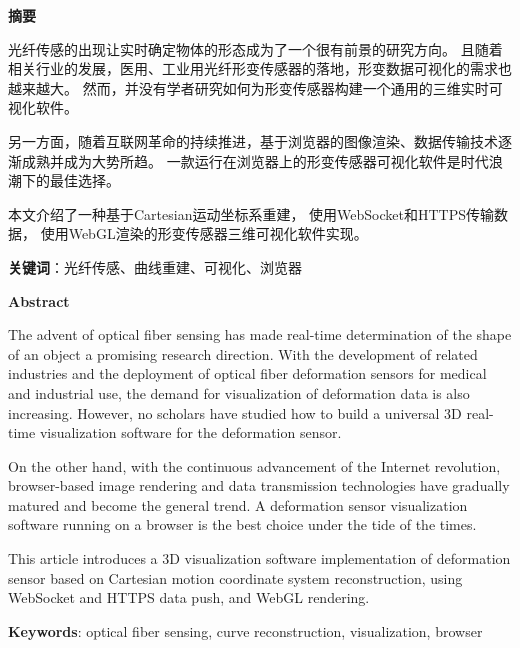 \cleardoublepage{}
\begin{center}
    \bfseries {} 摘要
\end{center}

光纤传感的出现让实时确定物体的形态成为了一个很有前景的研究方向。
且随着相关行业的发展，医用、工业用光纤形变传感器的落地，形变数据可视化的需求也越来越大。
然而，并没有学者研究如何为形变传感器构建一个通用的三维实时可视化软件。

另一方面，随着互联网革命的持续推进，基于浏览器的图像渲染、数据传输技术逐渐成熟并成为大势所趋。
一款运行在浏览器上的形变传感器可视化软件是时代浪潮下的最佳选择。

本文介绍了一种基于Cartesian运动坐标系重建，
使用WebSocket和HTTPS传输数据，
使用WebGL渲染的形变传感器三维可视化软件实现。

\textbf{关键词}：光纤传感、曲线重建、可视化、浏览器

\cleardoublepage{}
\begin{center}
    \bfseries {} Abstract
\end{center}

The advent of optical fiber sensing has made real-time determination of the shape of an object a promising research direction. 
With the development of related industries and the deployment of optical fiber deformation sensors for medical and industrial use, 
the demand for visualization of deformation data is also increasing. 
However, no scholars have studied how to build a universal 3D real-time visualization software for the deformation sensor.

On the other hand, with the continuous advancement of the Internet revolution, 
browser-based image rendering and data transmission technologies have gradually matured and become the general trend. 
A deformation sensor visualization software running on a browser is the best choice under the tide of the times.

This article introduces a 3D visualization software implementation of deformation sensor 
based on Cartesian motion coordinate system reconstruction, using WebSocket and HTTPS data push, and WebGL rendering.

\textbf{Keywords}: optical fiber sensing, curve reconstruction, visualization, browser